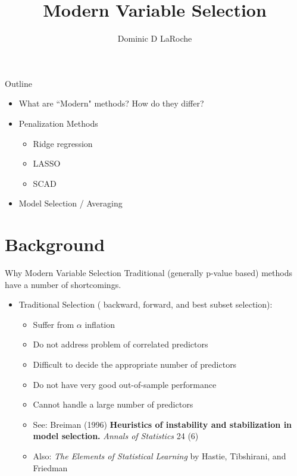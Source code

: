 \documentclass{beamer}\usepackage[]{graphicx}\usepackage[]{color}
\title{Modern Variable Selection}
\author{Dominic D LaRoche}
\begin{document}
\maketitle

\begin{frame}{Outline}
\begin{itemize}
\item What are ``Modern" methods?  How do they differ?
\item Penalization Methods
  \begin{itemize}
  \item Ridge regression
  \item LASSO
  \item SCAD
  \end{itemize}
\item Model Selection / Averaging
\end{itemize}
\end{frame}

\section{Background}

\begin{frame}{Why Modern Variable Selection}
Traditional (generally p-value based) methods have a number of shortcomings.
\begin{itemize}
\item Traditional Selection ( backward, forward, and best subset selection):
  \begin{itemize}
  \item Suffer from $\alpha$ inflation
  \item Do not address problem of correlated predictors
  \item Difficult to decide the appropriate number of predictors
  \item Do not have very good out-of-sample performance
  \item Cannot handle a large number of predictors
  \item See: Breiman (1996) \textbf{Heuristics of instability and stabilization in model selection.} \emph{Annals of Statistics} 24 (6)
  \item Also: \emph{The Elements of Statistical Learning} by Hastie, Tibshirani, and Friedman
  \end{itemize}
\end{itemize}
\end{frame}
\end{document}
